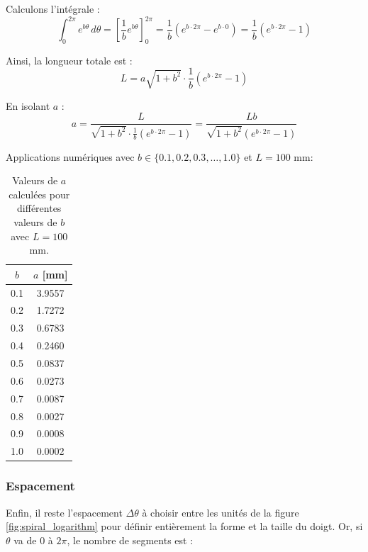 \documentclass[a4paper, 11pt]{report}
\begin{document}
            Calculons l'intégrale :
            \[
            \int_0^{2\pi} e^{b \theta} \, d\theta = \left[ \frac{1}{b} e^{b \theta} \right]_0^{2\pi} = \frac{1}{b} \left( e^{b \cdot 2\pi} - e^{b \cdot 0} \right) = \frac{1}{b} \left( e^{b \cdot 2\pi} - 1 \right)
            \]
            
            Ainsi, la longueur totale est :
            \[
            L = a \sqrt{1 + b^2} \cdot \frac{1}{b} \left( e^{b \cdot 2\pi} - 1 \right)
            \]
            
            En isolant \( a \) :
            \[
            a = \frac{L}{\sqrt{1 + b^2} \cdot \frac{1}{b} \left( e^{b \cdot 2\pi} - 1 \right)} = \frac{L b}{\sqrt{1 + b^2} \left( e^{b \cdot 2\pi} - 1 \right)}
            \]
            
            Applications numériques avec \( b \in \{0.1, 0.2, 0.3, \dots, 1.0\} \) et \( L = 100 \) mm:

            \begin{table}[h!]
                \centering
                \begin{tabular}{@{}c S[table-format=1.4]@{}}
                \toprule
                $b$ & {$a$ [mm]} \\
                 & 3.9557 \\
                0.2 & 1.7272 \\
                0.3 & 0.6783 \\
                0.4 & 0.2460 \\
                0.5 & 0.0837 \\
                0.6 & 0.0273 \\
                0.7 & 0.0087 \\
                0.8 & 0.0027 \\
                0.9 & 0.0008 \\
                1.0 & 0.0002 \\
                \bottomrule
                \end{tabular}
                \caption{Valeurs de $a$ calculées pour différentes valeurs de $b$ avec $L=100$ mm.}
            \end{table}

        \subsubsection{Espacement}
            
            Enfin, il reste l'espacement $\Delta\theta$ à choisir entre les unités de la figure \ref{fig:spiral_logarithm} pour définir entièrement la forme et la taille du doigt. \cite{wang_spirobs_2025} Or, si $\theta$ va de $0$ à $2\pi$, le nombre de segments est :
        
\end{document}
